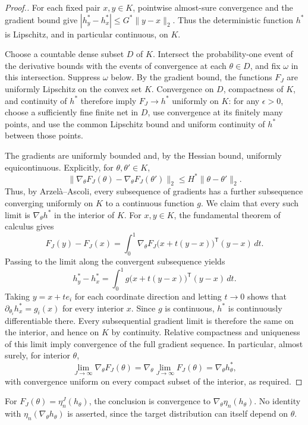\begin{proof}[Proof.]
For each fixed pair $x,y\in K$, pointwise almost-sure convergence and the gradient bound give $|h_y^*-h_x^*|\leq G^*\|y-x\|_2$. Thus the deterministic function $h^*$ is Lipschitz, and in particular continuous, on $K$.

Choose a countable dense subset $D$ of $K$. Intersect the probability-one event of the derivative bounds with the events of convergence at each $\theta\in D$, and fix $\omega$ in this intersection. Suppress $\omega$ below. By the gradient bound, the functions $F_J$ are uniformly Lipschitz on the convex set $K$. Convergence on $D$, compactness of $K$, and continuity of $h^*$ therefore imply $F_J\to h^*$ uniformly on $K$: for any $\epsilon>0$, choose a sufficiently fine finite net in $D$, use convergence at its finitely many points, and use the common Lipschitz bound and uniform continuity of $h^*$ between those points.

The gradients are uniformly bounded and, by the Hessian bound, uniformly equicontinuous. Explicitly, for $\theta,\theta'\in K$,
\begin{equation}
\|\nabla_\theta F_J(\theta)-\nabla_\theta F_J(\theta')\|_2
\leq H^*\|\theta-\theta'\|_2.
\end{equation}
Thus, by Arzel\`a--Ascoli, every subsequence of gradients has a further subsequence converging uniformly on $K$ to a continuous function $g$. We claim that every such limit is $\nabla_\theta h^*$ in the interior of $K$. For $x,y\in K$, the fundamental theorem of calculus gives
\begin{equation}
F_J(y)-F_J(x)
=\int_0^1\nabla_\theta F_J\bigl(x+t(y-x)\bigr)^{\mathsf T}(y-x)\,dt.
\end{equation}
Passing to the limit along the convergent subsequence yields
\begin{equation}
h_y^*-h_x^*
=\int_0^1 g\bigl(x+t(y-x)\bigr)^{\mathsf T}(y-x)\,dt.
\end{equation}
Taking $y=x+te_i$ for each coordinate direction and letting $t\to0$ shows that $\partial_{\theta_i}h_x^*=g_i(x)$ for every interior $x$. Since $g$ is continuous, $h^*$ is continuously differentiable there. Every subsequential gradient limit is therefore the same on the interior, and hence on $K$ by continuity. Relative compactness and uniqueness of this limit imply convergence of the full gradient sequence. In particular, almost surely, for interior $\theta$,
\begin{equation}
\lim_{J\to\infty}\nabla_\theta F_J(\theta)
=\nabla_\theta\lim_{J\to\infty}F_J(\theta)
=\nabla_\theta h_\theta^*,
\end{equation}
with convergence uniform on every compact subset of the interior, as required.
\end{proof}
For $F_J(\theta)=\eta_n^J(h_\theta)$, the conclusion is convergence to $\nabla_\theta\eta_n(h_\theta)$. No identity with $\eta_n(\nabla_\theta h_\theta)$ is asserted, since the target distribution can itself depend on $\theta$.

